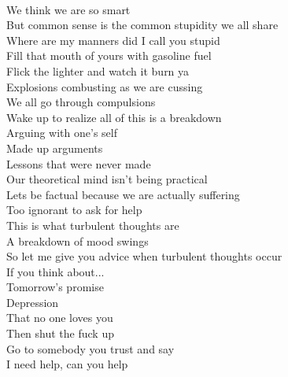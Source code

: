 \documentclass[12pt, b5paper]{article}
\begin{document}
\\We think we are so smart
\\But common sense is the common stupidity we all share
\\Where are my manners did I call you stupid
\\Fill that mouth of yours with gasoline fuel
\\Flick the lighter and watch it burn ya
\\Explosions combusting as we are cussing
\\We all go through compulsions
\\Wake up to realize all of this is a breakdown
\\Arguing with one's self
\\Made up arguments
\\Lessons that were never made
\\Our theoretical mind isn't being practical
\\Lets be factual because we are actually suffering
\\Too ignorant to ask for help
\\This is what turbulent thoughts are
\\A breakdown of mood swings
\\So let me give you advice when turbulent thoughts occur
\\If you think about... 
\\Tomorrow's promise 
\\Depression
\\That no one loves you
\\Then shut the fuck up
\\Go to somebody you trust and say
\\I need help, can you help
\end{document}
